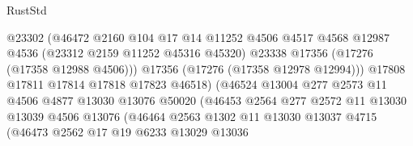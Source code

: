 \begin{lexlean}{RustStd}
\begin{coremodule}
                                      @23302
                                      (@46472
                                        @2160
                                        @104
                                        @17
                                        @14
                                        @11252
                                        @4506
                                        @4517
                                        @4568
                                        @12987
                                        @4536
                                        (@23312 @2159 @11252 @45316 @45320)
                                        @23338
                                        @17356
                                        (@17276 (@17358 @12988 @4506)))
                                      @17356
                                      (@17276 (@17358 @12978 @12994)))
                                    @17808
                                    @17811
                                    @17814
                                    @17818
                                    @17823
                                    @46518)
                                  (@46524
                                    @13004
                                    @277
                                    @2573
                                    @11
                                    @4506
                                    @4877
                                    @13030
                                    @13076
                                    @50020
                                    (@46453
                                      @2564
                                      @277
                                      @2572
                                      @11
                                      @13030
                                      @13039
                                      @4506
                                      @13076
                                      (@46464
                                        @2563
                                        @1302
                                        @11
                                        @13030
                                        @13037
                                        @4715
                                        (@46473
                                          @2562
                                          @17
                                          @19
                                          @6233
                                          @13029
                                          @13036

\end{coremodule}
\end{lexlean}
